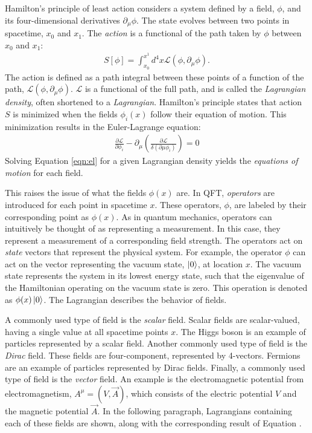 Hamilton's principle of least action considers a system defined by a field, $\phi$, and its four-dimensional derivatives $\partial_\mu\phi$.
The state evolves between two points in spacetime, $x_0$ and $x_1$.
The \emph{action} is a functional of the path taken by $\phi$ between $x_0$ and $x_1$:
\begin{equation}\begin{split}
S[\phi]=\int_{x_0}^{x^1} d^4x\mathcal{L}(\phi,\partial_\mu\phi).
\end{split}\end{equation}
The action is defined as a path integral between these points of a function of the path, $\mathcal{L}(\phi,\partial_\mu\phi)$.
$\mathcal{L}$ is a functional of the full path, and is called the \emph{Lagrangian density}, often shortened to a \emph{Lagrangian}.
Hamilton's principle states that action $S$ is minimized when the fields $\phi_i(x)$ follow their equation of motion.
This minimization results in the Euler-Lagrange equation:
\begin{equation}\begin{split}\label{eqn:el}
    \frac{\partial\mathcal{L}}{\partial\phi_i}-\partial_\mu\left(\frac{\partial\mathcal{L}}{\delta(\partial\mu\phi_i)}\right)=0
\end{split}\end{equation} 
Solving Equation \ref{eqn:el} for a given Lagrangian density yields the \emph{equations of motion} for each field.

This raises the issue of what the fields $\phi(x)$ are.
In QFT, \emph{operators} are introduced for each point in spacetime $x$.
These operators, $\phi$, are labeled by their corresponding point as $\phi(x)$.
As in quantum mechanics, operators can intuitively be thought of as representing a measurement. In this case, they represent a measurement of a corresponding field strength.
The operators act on \emph{state} vectors that represent the physical system.
For example, the operator $\phi$ can act on the vector representing the vacuum state, $\ket{0}$, at location $x$.
The vacuum state represents the system in its lowest energy state, such that the eigenvalue of the Hamiltonian operating on the vacuum state is zero.
This operation is denoted as $\phi(x)\ket{0}$.
The Lagrangian describes the behavior of fields.

A commonly used type of field is the \emph{scalar} field.
Scalar fields are scalar-valued, having a single value at all spacetime points $x$.
The Higgs boson is an example of particles represented by a scalar field.
Another commonly used type of field is the \emph{Dirac} field.
These fields are four-component, represented by 4-vectors.
Fermions are an example of particles represented by Dirac fields.
Finally, a commonly used type of field is the \emph{vector} field.
An example is the electromagnetic potential from electromagnetism, $A^\mu=(V,\vec{A})$, which consists of the electric potential $V$ and the magnetic potential $\vec{A}$.
In the following paragraph, Lagrangians containing each of these fields are shown, along with the corresponding result of Equation \label{eqn:el}.


